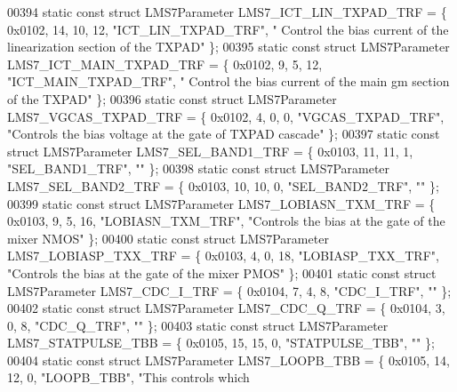 \begin{DoxyCode}
00394 \textcolor{keyword}{static} \textcolor{keyword}{const} \textcolor{keyword}{struct }LMS7Parameter LMS7_ICT_LIN_TXPAD_TRF = \{ 0x0102, 14, 10, 12, \textcolor{stringliteral}{"ICT\_LIN\_TXPAD\_TRF"}, \textcolor{stringliteral}{"
      Control the bias current of the linearization section of the TXPAD"} \};
00395 \textcolor{keyword}{static} \textcolor{keyword}{const} \textcolor{keyword}{struct }LMS7Parameter LMS7_ICT_MAIN_TXPAD_TRF = \{ 0x0102, 9, 5, 12, \textcolor{stringliteral}{"ICT\_MAIN\_TXPAD\_TRF"}, \textcolor{stringliteral}{"
      Control the bias current of the main gm section of the TXPAD"} \};
00396 \textcolor{keyword}{static} \textcolor{keyword}{const} \textcolor{keyword}{struct }LMS7Parameter LMS7_VGCAS_TXPAD_TRF = \{ 0x0102, 4, 0, 0, \textcolor{stringliteral}{"VGCAS\_TXPAD\_TRF"}, \textcolor{stringliteral}{"Controls
       the bias voltage at the gate of TXPAD cascade"} \};
00397 \textcolor{keyword}{static} \textcolor{keyword}{const} \textcolor{keyword}{struct }LMS7Parameter LMS7_SEL_BAND1_TRF = \{ 0x0103, 11, 11, 1, \textcolor{stringliteral}{"SEL\_BAND1\_TRF"}, \textcolor{stringliteral}{""} \};
00398 \textcolor{keyword}{static} \textcolor{keyword}{const} \textcolor{keyword}{struct }LMS7Parameter LMS7_SEL_BAND2_TRF = \{ 0x0103, 10, 10, 0, \textcolor{stringliteral}{"SEL\_BAND2\_TRF"}, \textcolor{stringliteral}{""} \};
00399 \textcolor{keyword}{static} \textcolor{keyword}{const} \textcolor{keyword}{struct }LMS7Parameter LMS7_LOBIASN_TXM_TRF = \{ 0x0103, 9, 5, 16, \textcolor{stringliteral}{"LOBIASN\_TXM\_TRF"}, \textcolor{stringliteral}{"Controls
       the bias at the gate of the mixer NMOS"} \};
00400 \textcolor{keyword}{static} \textcolor{keyword}{const} \textcolor{keyword}{struct }LMS7Parameter LMS7_LOBIASP_TXX_TRF = \{ 0x0103, 4, 0, 18, \textcolor{stringliteral}{"LOBIASP\_TXX\_TRF"}, \textcolor{stringliteral}{"Controls
       the bias at the gate of the mixer PMOS"} \};
00401 \textcolor{keyword}{static} \textcolor{keyword}{const} \textcolor{keyword}{struct }LMS7Parameter LMS7_CDC_I_TRF = \{ 0x0104, 7, 4, 8, \textcolor{stringliteral}{"CDC\_I\_TRF"}, \textcolor{stringliteral}{""} \};
00402 \textcolor{keyword}{static} \textcolor{keyword}{const} \textcolor{keyword}{struct }LMS7Parameter LMS7_CDC_Q_TRF = \{ 0x0104, 3, 0, 8, \textcolor{stringliteral}{"CDC\_Q\_TRF"}, \textcolor{stringliteral}{""} \};
00403 \textcolor{keyword}{static} \textcolor{keyword}{const} \textcolor{keyword}{struct }LMS7Parameter LMS7_STATPULSE_TBB = \{ 0x0105, 15, 15, 0, \textcolor{stringliteral}{"STATPULSE\_TBB"}, \textcolor{stringliteral}{""} \};
00404 \textcolor{keyword}{static} \textcolor{keyword}{const} \textcolor{keyword}{struct }LMS7Parameter LMS7_LOOPB_TBB = \{ 0x0105, 14, 12, 0, \textcolor{stringliteral}{"LOOPB\_TBB"}, \textcolor{stringliteral}{"This controls which
}
\end{DoxyCode}
